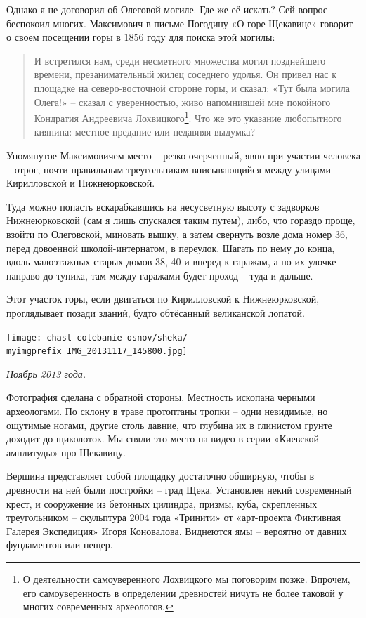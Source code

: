 Однако я не договорил об Олеговой могиле. Где же её искать? Сей вопрос беспокоил многих. Максимович в письме Погодину «О горе Щекавице» говорит о своем посещении горы в 1856 году для поиска этой могилы:

\begin{quotation}
И встретился нам, среди несметного множества могил позднейшего времени, презанимательный жилец соседнего удолья. Он привел нас к площадке на северо-восточной стороне горы, и сказал: «Тут была могила Олега!» – сказал с уверенностью, живо напомнившей мне покойного Кондратия Андреевича Лохвицкого\footnote{О деятельности самоуверенного Лохвицкого мы поговорим позже. Впрочем, его самоуверенность в определении древностей ничуть не более таковой у многих современных археологов.}. Что же это указание любопытного киянина: местное предание или недавняя выдумка?
\end{quotation}

Упомянутое Максимовичем место – резко очерченный, явно при участии человека – отрог, почти правильным треугольником вписывающийся между улицами Кирилловской и Нижнеюрковской. 

Туда можно попасть вскарабкавшись на несусветную высоту с задворков Нижнеюрковской (сам я лишь спускался таким путем), либо, что гораздо проще, взойти по Олеговской, миновать вышку, а затем свернуть возле дома номер 36, перед довоенной школой-интернатом, в переулок. Шагать по нему до конца, вдоль малоэтажных старых домов 38, 40 и вперед к гаражам, а по их улочке направо до тупика, там между гаражами будет проход – туда и дальше. 

Этот участок горы, если двигаться по Кирилловской к Нижнеюрковской, проглядывает позади зданий, будто обтёсанный великанской лопатой.

\begin{center}
\texttt{[image: chast-colebanie-osnov/sheka/\\myimgprefix IMG\_20131117\_145800.jpg]}

\textit{Ноябрь 2013 года.}
\end{center}

Фотография сделана с обратной стороны. Местность ископана черными археологами. По склону в траве протоптаны тропки – одни невидимые, но ощутимые ногами, другие столь давние, что глубина их в глинистом грунте доходит до щиколоток. Мы сняли это место на видео в серии «Киевской амплитуды» про Щекавицу.
  
Вершина представляет собой площадку достаточно обширную, чтобы в древности на ней были постройки – град Щека. Установлен некий современный крест, и сооружение из бетонных  цилиндра, призмы, куба, скрепленных треугольником – скульптура 2004 года «Тринити» от «арт-проекта Фиктивная Галерея Экспедиция» Игоря Коновалова. Виднеются ямы – вероятно от давних фундаментов или пещер.

